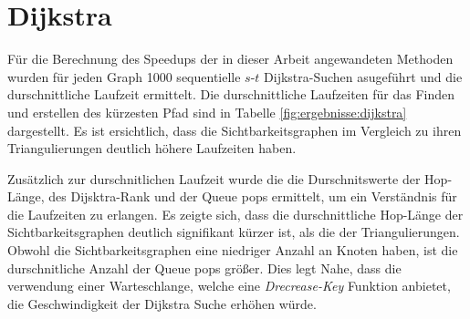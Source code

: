 
%
%
%

\section{Dijkstra}

Für die Berechnung des Speedups der in dieser Arbeit angewandeten Methoden wurden für jeden Graph \num{1000} sequentielle $s$-$t$ Dijkstra-Suchen asugeführt und die durschnittliche Laufzeit ermittelt.
Die durschnittliche Laufzeiten für das Finden und erstellen des kürzesten Pfad sind in Tabelle \ref{fig:ergebnisse:dijkstra} dargestellt.
Es ist ersichtlich, dass die Sichtbarkeitsgraphen im Vergleich zu ihren Triangulierungen deutlich höhere Laufzeiten haben.

Zusätzlich zur durschnitlichen Laufzeit wurde die die Durschnitswerte der Hop-Länge, des Dijsktra-Rank und der Queue pops ermittelt, um ein Verständnis für die Laufzeiten zu erlangen.
Es zeigte sich, dass die durschnittliche Hop-Länge der Sichtbarkeitsgraphen deutlich signifikant kürzer ist, als die der Triangulierungen.
Obwohl die Sichtbarkeitsgraphen eine niedriger Anzahl an Knoten haben, ist die durschnitliche Anzahl der Queue pops größer.
Dies legt Nahe, dass die verwendung einer Warteschlange, welche eine \emph{Drecrease-Key} Funktion anbietet, die Geschwindigkeit der Dijkstra Suche erhöhen würde.

